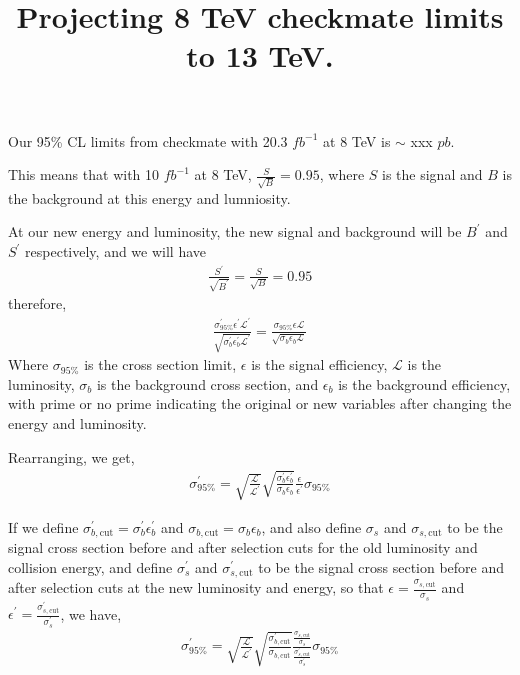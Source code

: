 \documentclass[12pt,a4paper]{article}
\begin{document}
\title{Projecting 8 TeV checkmate limits to 13 TeV.}
\maketitle
Our 95\% CL limits from checkmate with 20.3 $fb^{-1}$ at 8 TeV is $\sim$ xxx $pb$.

This means that with 10 $fb^{-1}$ at 8 TeV, $\frac{S}{\sqrt{B}} = 0.95$, where $S$ is the signal and $B$ is the background at this energy and lumniosity.

At our new energy and luminosity, the new signal and background will be $B^{\prime}$ and $S^{\prime}$ respectively, and we will have
\begin{align}
  \frac{S^{\prime}}{\sqrt{B^{\prime}}} = \frac{S}{\sqrt{B}} = 0.95
\end{align}
therefore,
\begin{align}
  \frac{\sigma_{\text{95\%}}^{\prime} \epsilon^{\prime} \mathcal{L}^{\prime}} {\sqrt{\sigma_{b}^{\prime} \epsilon_{b}^{\prime} \mathcal{L}^{\prime}}} 
=   \frac{\sigma_{\text{95\%}} \epsilon \mathcal{L}} {\sqrt{\sigma_{b} \epsilon_{b} \mathcal{L}}}
\end{align}
Where  $\sigma_{\text{95\%}}$ is the cross section limit,  $\epsilon$ is the signal efficiency,  $\mathcal{L}$ is the luminosity, $\sigma_{b}$ is the background cross section, and
$\epsilon_{b}$ is the background efficiency, with prime or no prime indicating the original or new variables after changing the energy and luminosity.

Rearranging, we get,
\begin{align}
  \sigma_{\text{95\%}}^{\prime} = \sqrt{\frac{\mathcal{L}}{\mathcal{L}^{\prime}}} 
  \sqrt{\frac{\sigma_{b}^{\prime} \epsilon_{b}^{\prime}}{\sigma_{b} \epsilon_{b}}}
  \frac{\epsilon}{\epsilon^{\prime}} \sigma_{\text{95\%}}
\end{align}

If we define $\sigma_{b,\text{cut}}^{\prime} = \sigma_{b}^{\prime} \epsilon_{b}^{\prime}$ and $\sigma_{b,\text{cut}} = \sigma_{b} \epsilon_{b}$, and also
define $\sigma_{s}$ and $\sigma_{s,\text{cut}}$ to be the signal cross section before and after selection cuts for the old luminosity and collision energy, and 
define $\sigma_{s}^{\prime}$ and $\sigma_{s,\text{cut}}^{\prime}$ to be the signal cross section before and after selection cuts at the new luminosity and energy,
so that $\epsilon = \frac{\sigma_{s,\text{cut}}}{\sigma_{s}}$ and $\epsilon^{\prime} = \frac{\sigma_{s,\text{cut}}^{\prime}}{\sigma_{s}^{\prime}}$,
we have,
\begin{align}
  \sigma_{\text{95\%}}^{\prime} = \sqrt{\frac{\mathcal{L}}{\mathcal{L}^{\prime}}} 
  \sqrt{\frac{\sigma_{b,\text{cut}}^{\prime}}{\sigma_{b,\text{cut}}}}
  \frac{\frac{\sigma_{s,\text{cut}}}{\sigma_{s}}}{\frac{\sigma_{s,\text{cut}}^{\prime}}{\sigma_{s}^{\prime}}} \sigma_{\text{95\%}}
\end{align}
\end{document}
